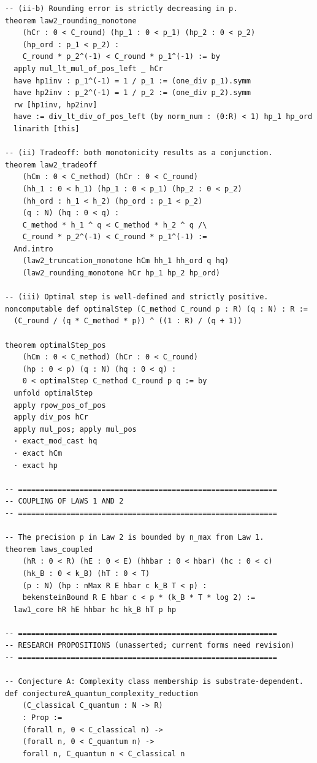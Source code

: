 \documentclass[12pt]{article}
\theoremstyle{lawstyle}
\theoremstyle{conjstyle}
\theoremstyle{predstyle}
\begin{document}
\begin{verbatim}
-- (ii-b) Rounding error is strictly decreasing in p.
theorem law2_rounding_monotone
    (hCr : 0 < C_round) (hp_1 : 0 < p_1) (hp_2 : 0 < p_2)
    (hp_ord : p_1 < p_2) :
    C_round * p_2^(-1) < C_round * p_1^(-1) := by
  apply mul_lt_mul_of_pos_left _ hCr
  have hp1inv : p_1^(-1) = 1 / p_1 := (one_div p_1).symm
  have hp2inv : p_2^(-1) = 1 / p_2 := (one_div p_2).symm
  rw [hp1inv, hp2inv]
  have := div_lt_div_of_pos_left (by norm_num : (0:R) < 1) hp_1 hp_ord
  linarith [this]

-- (ii) Tradeoff: both monotonicity results as a conjunction.
theorem law2_tradeoff
    (hCm : 0 < C_method) (hCr : 0 < C_round)
    (hh_1 : 0 < h_1) (hp_1 : 0 < p_1) (hp_2 : 0 < p_2)
    (hh_ord : h_1 < h_2) (hp_ord : p_1 < p_2)
    (q : N) (hq : 0 < q) :
    C_method * h_1 ^ q < C_method * h_2 ^ q /\
    C_round * p_2^(-1) < C_round * p_1^(-1) :=
  And.intro
    (law2_truncation_monotone hCm hh_1 hh_ord q hq)
    (law2_rounding_monotone hCr hp_1 hp_2 hp_ord)

-- (iii) Optimal step is well-defined and strictly positive.
noncomputable def optimalStep (C_method C_round p : R) (q : N) : R :=
  (C_round / (q * C_method * p)) ^ ((1 : R) / (q + 1))

theorem optimalStep_pos
    (hCm : 0 < C_method) (hCr : 0 < C_round)
    (hp : 0 < p) (q : N) (hq : 0 < q) :
    0 < optimalStep C_method C_round p q := by
  unfold optimalStep
  apply rpow_pos_of_pos
  apply div_pos hCr
  apply mul_pos; apply mul_pos
  · exact_mod_cast hq
  · exact hCm
  · exact hp

-- ===========================================================
-- COUPLING OF LAWS 1 AND 2
-- ===========================================================

-- The precision p in Law 2 is bounded by n_max from Law 1.
theorem laws_coupled
    (hR : 0 < R) (hE : 0 < E) (hhbar : 0 < hbar) (hc : 0 < c)
    (hk_B : 0 < k_B) (hT : 0 < T)
    (p : N) (hp : nMax R E hbar c k_B T < p) :
    bekensteinBound R E hbar c < p * (k_B * T * log 2) :=
  law1_core hR hE hhbar hc hk_B hT p hp

-- ===========================================================
-- RESEARCH PROPOSITIONS (unasserted; current forms need revision)
-- ===========================================================

-- Conjecture A: Complexity class membership is substrate-dependent.
def conjectureA_quantum_complexity_reduction
    (C_classical C_quantum : N -> R)
    : Prop :=
    (forall n, 0 < C_classical n) ->
    (forall n, 0 < C_quantum n) ->
    forall n, C_quantum n < C_classical n


\end{verbatim}
\end{document}
